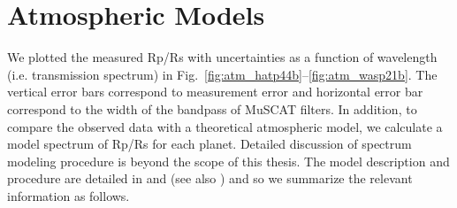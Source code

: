 
\section{Atmospheric Models}
We plotted the measured Rp/Rs with uncertainties as a function of wavelength (i.e. transmission spectrum) in Fig.~\ref{fig:atm_hatp44b}--\ref{fig:atm_wasp21b}. The vertical error bars correspond to measurement error and horizontal error bar correspond to the width of the bandpass of MuSCAT filters.
In addition, to compare the observed data with a theoretical atmospheric model, we calculate a model spectrum of Rp/Rs for each planet. Detailed discussion of spectrum modeling procedure is beyond the scope of this thesis. The model description and procedure are detailed in \cite{Kawashima2015} and \cite{Kawashima2017} (see also \cite{Fukui2014}) and so we summarize the relevant information as follows.


